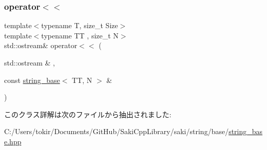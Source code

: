 \subsubsection{\texorpdfstring{operator$<$$<$}{operator<<}}
{\footnotesize\ttfamily template$<$typename T, size\+\_\+t Size$>$ \\
template$<$typename TT , size\+\_\+t N$>$ \\
std\+::ostream\& operator$<$$<$ (\begin{DoxyParamCaption}\item[{std\+::ostream \&}]{,  }\item[{const \mbox{\hyperlink{classsaki_1_1string__base}{string\+\_\+base}}$<$ TT, N $>$ \&}]{ }\end{DoxyParamCaption})\hspace{0.3cm}{\ttfamily [friend]}}



このクラス詳解は次のファイルから抽出されました\+:\begin{DoxyCompactItemize}
\item 
C\+:/\+Users/tokir/\+Documents/\+Git\+Hub/\+Saki\+Cpp\+Library/saki/string/base/\mbox{\hyperlink{string__base_8hpp}{string\+\_\+base.\+hpp}}\end{DoxyCompactItemize}
